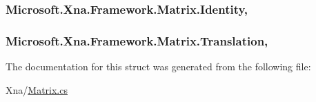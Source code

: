\subsubsection[{Identity}]{ Microsoft.\+Xna.\+Framework.\+Matrix.\+Identity\hspace{0.3cm}{\ttfamily [static]}, {\ttfamily [get]}}\label{struct_microsoft_1_1_xna_1_1_framework_1_1_matrix_abb49959e414b2a271be43fcf9c2113e7}
\hypertarget{struct_microsoft_1_1_xna_1_1_framework_1_1_matrix_adb98e5544eaaffefc7e1d4a269a7f07f}{}
\subsubsection[{Translation}]{ Microsoft.\+Xna.\+Framework.\+Matrix.\+Translation\hspace{0.3cm}{\ttfamily [get]}, {\ttfamily [set]}}\label{struct_microsoft_1_1_xna_1_1_framework_1_1_matrix_adb98e5544eaaffefc7e1d4a269a7f07f}


The documentation for this struct was generated from the following file\+:\begin{DoxyCompactItemize}
\item 
Xna/\hyperlink{_matrix_8cs}{Matrix.\+cs}\end{DoxyCompactItemize}
